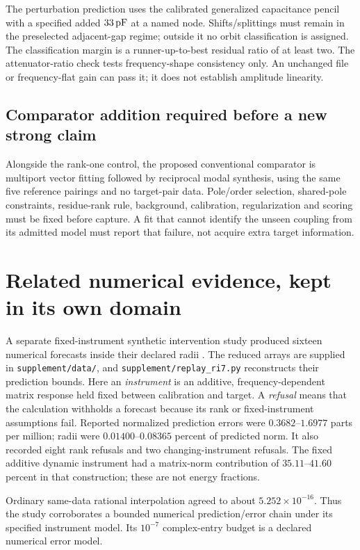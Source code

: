\documentclass[11pt]{article}
\begin{document}
The perturbation prediction uses the calibrated generalized capacitance
pencil with a specified added $33\,{\rm pF}$ at a named node.
Shifts/splittings must remain in the preselected adjacent-gap regime;
outside it no orbit classification is assigned. The classification margin is
a runner-up-to-best residual ratio of at least two.
The attenuator-ratio check tests frequency-shape consistency only.
An unchanged file or frequency-flat gain can pass it; it does not establish
amplitude linearity.

\subsection{Comparator addition required before a new strong claim}
Alongside the rank-one control, the proposed conventional comparator is
multiport vector fitting followed by reciprocal modal synthesis, using the
same five reference pairings and no target-pair data. Pole/order selection,
shared-pole constraints, residue-rank rule, background, calibration,
regularization and scoring must be fixed before capture. A fit that cannot
identify the unseen coupling from its admitted model must report that
failure, not acquire extra target information.

\section{Related numerical evidence, kept in its own domain}
A separate fixed-instrument synthetic intervention study produced sixteen
numerical forecasts inside their declared radii \cite{RF}. The reduced
arrays are supplied in \texttt{supplement/data/}, and
\texttt{supplement/replay\_ri7.py} reconstructs their prediction bounds.
Here an \emph{instrument} is an additive, frequency-dependent matrix
response held fixed between calibration and target. A \emph{refusal}
means that the calculation withholds a forecast because its rank or
fixed-instrument assumptions fail. Reported normalized
prediction errors were $0.3682$--$1.6977$ parts per million; radii were
$0.01400$--$0.08365$ percent of predicted norm. It also recorded eight
rank refusals and two changing-instrument refusals.
The fixed additive dynamic instrument had a matrix-norm contribution of
$35.11$--$41.60$ percent in that construction; these are not energy fractions.

Ordinary same-data rational interpolation agreed to about
$5.252\times10^{-16}$. Thus the study corroborates a bounded numerical
prediction/error chain under its specified instrument model.
Its $10^{-7}$ complex-entry budget is a declared numerical error model.
\end{document}
